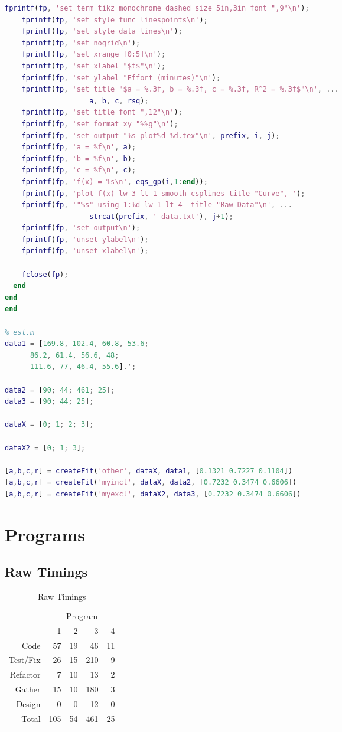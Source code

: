 \documentclass[a4paper,10pt]{article}
\begin{document}
\begin{appendices}
\begin{lstlisting}[language=Matlab]
    fprintf(fp, 'set term tikz monochrome dashed size 5in,3in font ",9"\n');
    fprintf(fp, 'set style func linespoints\n');
    fprintf(fp, 'set style data lines\n');
    fprintf(fp, 'set nogrid\n');
    fprintf(fp, 'set xrange [0:5]\n');
    fprintf(fp, 'set xlabel "$t$"\n');
    fprintf(fp, 'set ylabel "Effort (minutes)"\n');
    fprintf(fp, 'set title "$a = %.3f, b = %.3f, c = %.3f, R^2 = %.3f$"\n', ...
                    a, b, c, rsq);
    fprintf(fp, 'set title font ",12"\n');
    fprintf(fp, 'set format xy "%%g"\n');
    fprintf(fp, 'set output "%s-plot%d-%d.tex"\n', prefix, i, j);
    fprintf(fp, 'a = %f\n', a);
    fprintf(fp, 'b = %f\n', b);
    fprintf(fp, 'c = %f\n', c);
    fprintf(fp, 'f(x) = %s\n', eqs_gp(i,1:end));
    fprintf(fp, 'plot f(x) lw 3 lt 1 smooth csplines title "Curve", ');
    fprintf(fp, '"%s" using 1:%d lw 1 lt 4  title "Raw Data"\n', ...
                    strcat(prefix, '-data.txt'), j+1);
    fprintf(fp, 'set output\n');
    fprintf(fp, 'unset ylabel\n');
    fprintf(fp, 'unset xlabel\n');
    
    fclose(fp);
  end
end
end

% est.m
data1 = [169.8, 102.4, 60.8, 53.6;
	  86.2, 61.4, 56.6, 48;
	  111.6, 77, 46.4, 55.6].';
    
data2 = [90; 44; 461; 25];
data3 = [90; 44; 25];
    
dataX = [0; 1; 2; 3];

dataX2 = [0; 1; 3];

[a,b,c,r] = createFit('other', dataX, data1, [0.1321 0.7227 0.1104])
[a,b,c,r] = createFit('myincl', dataX, data2, [0.7232 0.3474 0.6606])
[a,b,c,r] = createFit('myexcl', dataX2, data3, [0.7232 0.3474 0.6606])
  \end{lstlisting}

  \clearpage
  \FloatBarrier
  \section{Programs}
  \label{sec:programs}
  
  \subsection{Raw Timings}
  \begin{table}[htb!]
    \centering
    \begin{tabular}{|r|rrrr|}
    \cline{2-5}
  \multicolumn{1}{c|}{} & \multicolumn{4}{|c|}{Program}  \\ 
  \multicolumn{1}{c|}{} & 1 & 2 & 3 & 4 \\ \hline
  Code & 57 & 19 & 46 & 11 \\
  Test/Fix & 26 & 15 & 210 & 9 \\
  Refactor & 7 & 10 & 13 & 2 \\
  Gather & 15 & 10 & 180 & 3 \\
  Design & 0 & 0 & 12 & 0 \\ \hline
  Total & 105 & 54 & 461 & 25 \\ \hline
    \end{tabular}
    \caption{Raw Timings}
    \label{tab:rawtimings}
  \end{table}
  

\end{appendices}
\end{document}
